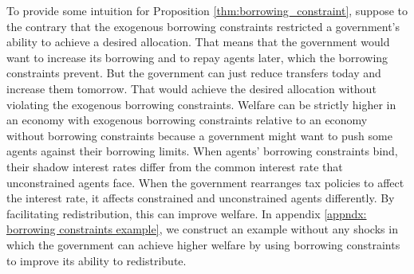 \documentclass[thmsb,11pt]{article}
\begin{document}
To provide some intuition for Proposition \ref{thm:borrowing_constraint}, suppose to the contrary that the exogenous borrowing constraints  restricted a  government's
 ability to achieve a desired allocation. That  means that
the government would want to increase  its borrowing
and to repay agents later, which the borrowing constraints prevent. But the government can just reduce
transfers today and increase them tomorrow. That would  achieve the  desired  allocation
without violating the exogenous borrowing constraints.
\color{blue}
Welfare can  be strictly higher in an economy  with exogenous
borrowing constraints  relative to an economy without borrowing constraints because  a government might want to
push some agents against their borrowing limits. When agents' borrowing
constraints bind, their shadow interest rates differ from the
common interest rate that unconstrained agents face. When the government rearranges tax
policies to  affect the  interest rate, it affects constrained and unconstrained agents
 differently.  By facilitating
redistribution, this can improve welfare. %
In appendix \ref{appndx: borrowing constraints example}, we construct an example without any
shocks in which the government can achieve higher welfare by using borrowing
constraints to improve its ability to redistribute.
\color{black}
\end{document}
